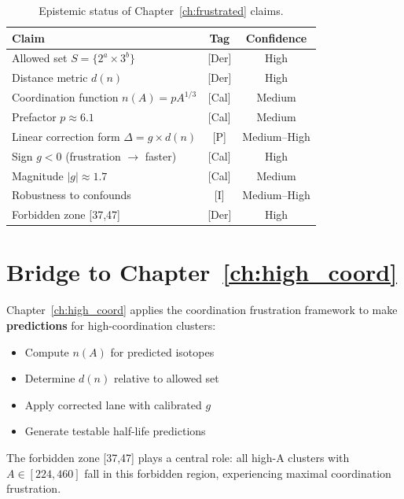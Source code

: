\begin{table}[h]
\centering
\caption{Epistemic status of Chapter~\ref{ch:frustrated} claims.}
\label{tab:f:epistemic}
\begin{tabular}{p{5.5cm}cc}
    \toprule
    Claim & Tag & Confidence \\
    \midrule
    Allowed set $S = \{2^a \times 3^b\}$ & [Der] & High \\
    Distance metric $d(n)$ & [Der] & High \\
    Coordination function $n(A) = p A^{1/3}$ & [Cal] & Medium \\
    Prefactor $p \approx 6.1$ & [Cal] & Medium \\
    Linear correction form $\Delta = g \times d(n)$ & [P] & Medium--High \\
    Sign $g < 0$ (frustration $\to$ faster) & [Cal] & High \\
    Magnitude $|g| \approx 1.7$ & [Cal] & Medium \\
    Robustness to confounds & [I] & Medium--High \\
    Forbidden zone [37,47] & [Der] & High \\
    \bottomrule
\end{tabular}
\end{table}

\section{Bridge to Chapter~\ref{ch:high_coord}}
\label{sec:frustrated:bridge}

Chapter~\ref{ch:high_coord} applies the coordination frustration framework
to make \textbf{predictions} for high-coordination clusters:

\begin{itemize}
    \item Compute $n(A)$ for predicted isotopes
    \item Determine $d(n)$ relative to allowed set
    \item Apply corrected lane with calibrated $g$
    \item Generate testable half-life predictions
\end{itemize}

The forbidden zone [37,47] plays a central role: all high-A clusters
with $A \in [224, 460]$ fall in this forbidden region, experiencing
maximal coordination frustration. \tagP

